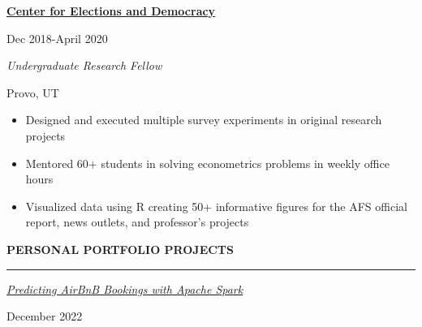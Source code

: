 \documentclass[
  16,
]{article}
\providecommand{\tightlist}{%
  \setlength{\itemsep}{0pt}\setlength{\parskip}{0pt}}\usepackage{longtable,booktabs,array}
\begin{document}
\vspace{7pt}

\begin{large}
  \begin{multicols}{2}
    \begin{flushleft}{\bf \href{http://csed.byu.edu/}{Center for Elections and Democracy}}\end{flushleft}
    \begin{flushright}Dec 2018-April 2020\end{flushright}
  \end{multicols}
  \vspace{-0.17cm}
  \begin{multicols}{2}
    \begin{flushleft}\textit{Undergraduate Research Fellow}\end{flushleft}
    \begin{flushright}Provo, UT\end{flushright}
  \end{multicols}
\end{large}
\vspace{-0.16cm}

\begin{itemize}
\tightlist
\item
  Designed and executed multiple survey experiments in original research
  projects
\item
  Mentored 60+ students in solving econometrics problems in weekly
  office hours
\item
  Visualized data using R creating 50+ informative figures for the AFS
  official report, news outlets, and professor's projects
\end{itemize}

\vspace{7pt}

\begin{large}
  {\bf PERSONAL PORTFOLIO PROJECTS}
  \vspace{3pt}
  \hrule
  \begin{multicols}{2}
    \begin{flushleft}\textit{\href{https://github.com/acbass49/predicting_bookings}{Predicting AirBnB Bookings with Apache Spark}}\end{flushleft}
    \begin{flushright}December 2022\end{flushright}
  \end{multicols}
  \vspace{-0.17cm}
\end{large}
\end{document}
